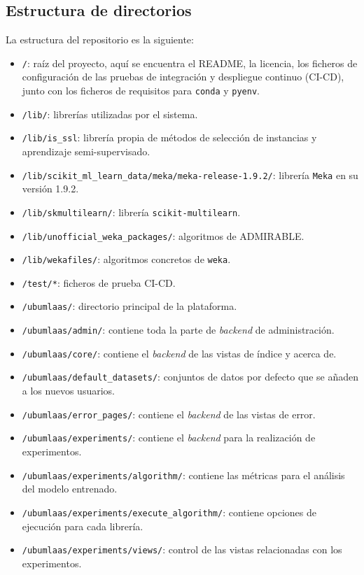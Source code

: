 \subsection{Estructura de directorios}
La estructura del repositorio es la siguiente:
\begin{itemize}
\tightlist
\item \texttt{/}: raíz del proyecto, aquí se encuentra el README, la licencia, los ficheros de configuración de las pruebas de integración y despliegue continuo (CI-CD), junto con los ficheros de requisitos para \texttt{conda} y \texttt{pyenv}. 
\item \texttt{/lib/}: librerías utilizadas por el sistema.
\item \texttt{/lib/is\_ssl}: librería propia de métodos de selección de instancias y aprendizaje semi-supervisado.
\item \texttt{/lib/scikit\_ml\_learn\_data/meka/meka-release-1.9.2/}: librería \texttt{Meka} en su versión 1.9.2.
\item \texttt{/lib/skmultilearn/}: librería \texttt{scikit-multilearn}.
\item \texttt{/lib/unofficial\_weka\_packages/}: algoritmos de ADMIRABLE.
\item \texttt{/lib/wekafiles/}: algoritmos concretos de \texttt{weka}.
\item \texttt{/test/*}: ficheros de prueba CI-CD.
\item \texttt{/ubumlaas/}: directorio principal de la plataforma.
\item \texttt{/ubumlaas/admin/}: contiene toda la parte de \textit{backend} de administración.
\item \texttt{/ubumlaas/core/}: contiene el \textit{backend} de las vistas de índice y acerca de.
\item \texttt{/ubumlaas/default\_datasets/}: conjuntos de datos por defecto que se añaden a los nuevos usuarios.
\item \texttt{/ubumlaas/error\_pages/}: contiene el \textit{backend} de las vistas de error.
\item \texttt{/ubumlaas/experiments/}: contiene el \textit{backend} para la realización de experimentos.
\item \texttt{/ubumlaas/experiments/algorithm/}: contiene las métricas para el análisis del modelo entrenado.
\item \texttt{/ubumlaas/experiments/execute\_algorithm/}: contiene opciones de ejecución para cada librería.
\item \texttt{/ubumlaas/experiments/views/}: control de las vistas relacionadas con los experimentos.

\end{itemize}
